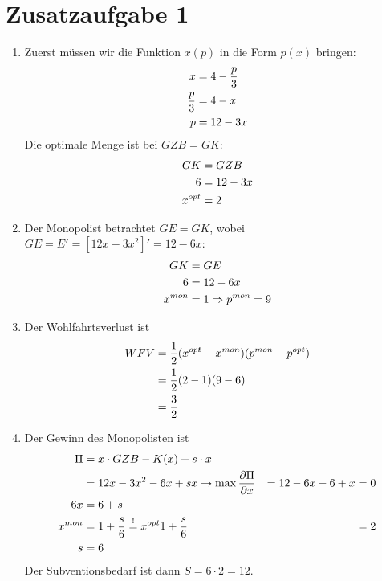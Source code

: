 \documentclass{article}
\begin{document}
	\section*{Zusatzaufgabe 1}
	\begin{enumerate}[label=(\alph*)]
		\item Zuerst müssen wir die Funktion $x(p)$ in die Form $p(x)$ bringen:
		\begin{align}
			x &= 4-\frac{p}{3} \notag \\
			\frac{p}{3} &= 4-x\notag \\
			p &= 12-3x \notag
		\end{align}
		Die optimale Menge ist bei $GZB=GK$:
		\begin{align}
			GK &= GZB \notag \\
			6 &= 12-3x \notag \\
			x^{opt} &= 2 \notag
		\end{align}
		\item Der Monopolist betrachtet $GE=GK$, wobei $GE=E'=[12x-3x^2]'=12-6x$:
		\begin{align}
			GK &= GE \notag \\
			6 &= 12-6x \notag \\
			x^{mon} &= 1 \Rightarrow p^{mon}=9 \notag
		\end{align}
		\item Der Wohlfahrtsverlust ist
		\begin{align}
			WFV &= \frac{1}{2}(x^{opt}-x^{mon})(p^{mon}-p^{opt}) \notag \\
			&= \frac{1}{2}(2-1)(9-6) \notag \\
			&= \frac{3}{2} \notag
		\end{align}
		\item Der Gewinn des Monopolisten ist
		\begin{align}
			\Pi &= x\cdot GZB - K(x) + s\cdot x \notag \\
			&= 12x-3x^2 - 6x + sx \to\max \notag
			\frac{\partial \Pi}{\partial x} &= 12-6x-6+x = 0 \notag \\
			6x &= 6+s \notag \\
			x^{mon} &= 1+\frac{s}{6} \overset{!}{=} x^{opt} \notag
			1+\frac{s}{6} &= 2 \notag \\
			s &= 6 \notag
		\end{align}
		Der Subventionsbedarf ist dann $S=6\cdot 2=12$.
	\end{enumerate}
\end{document}
